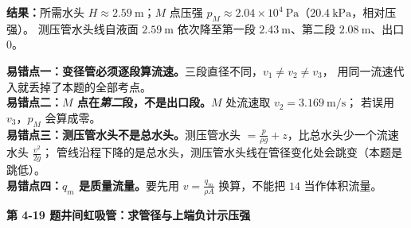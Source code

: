 \begin{jie}
\textbf{结果：}所需水头 $H\approx2.59\ \mathrm{m}$；$M$ 点压强 $p_M\approx2.04\times10^4\ \mathrm{Pa}$（$20.4\ \mathrm{kPa}$，相对压强）。
测压管水头线自液面 $2.59\ \mathrm{m}$ 依次降至第一段 $2.43\ \mathrm{m}$、第二段 $2.08\ \mathrm{m}$、出口 $0$。
\end{jie}

\begin{yicuo}
\textbf{易错点一：变径管必须逐段算流速。}三段直径不同，$v_1\neq v_2\neq v_3$，
用同一流速代入就丢掉了本题的全部考点。\\
\textbf{易错点二：$M$ 点在\emph{第二}段，不是出口段。}$M$ 处流速取 $v_2=3.169\ \mathrm{m/s}$；
若误用 $v_3$，$p_M$ 会算成零。\\
\textbf{易错点三：测压管水头不是总水头。}测压管水头 $=\frac{p}{\rho g}+z$，比总水头少一个流速水头 $\frac{v^2}{2g}$；
管线沿程下降的是总水头，测压管水头线在管径变化处会跳变（本题是跳低）。\\
\textbf{易错点四：$q_m$ 是质量流量。}要先用 $v=\frac{q_m}{\rho A}$ 换算，不能把 $14$ 当作体积流量。
\end{yicuo}

\noindent\textbf{第 4-19 题\quad 井间虹吸管：求管径与上端负计示压强}

